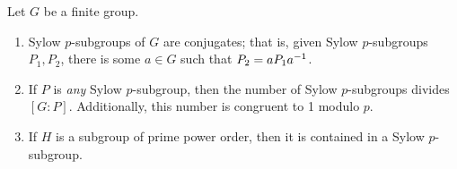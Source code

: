 \documentclass[./main.tex]{subfiles}
\begin{document}
\begin{theorem}
    Let $G$ be a finite group. 
    \begin{enumerate}[label=(\arabic*)]
        \item Sylow $p$-subgroups of $G$ are conjugates; that is, given Sylow
        $p$-subgroups $P_1, P_2$, there is some $a \in G$ such that $P_2 = a P_1
        a^{-1}$.

        \item If $P$ is \emph{any} Sylow $p$-subgroup, then the number of Sylow
        $p$-subgroups divides $[G:P]$. Additionally, this number is congruent to
        1 modulo $p$.

        \item If $H$ is a subgroup of prime power order, then it is contained in
        a Sylow $p$-subgroup.
    \end{enumerate}
\end{theorem}
\end{document}
